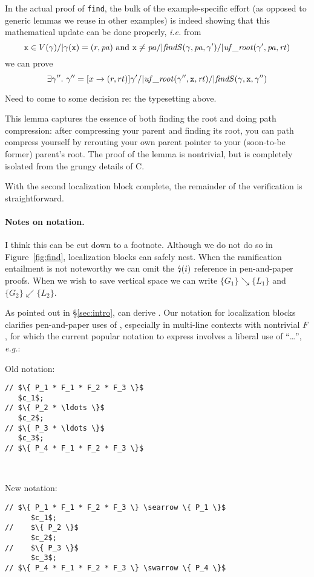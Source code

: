 In the actual proof of \texttt{find}, the bulk of the example-specific effort (as opposed to generic lemmas we reuse in other examples) is indeed showing that this mathematical update can be done properly, \emph{i.e.} from 
\[
\texttt{x} \in V(\gamma) /| \gamma(\texttt{x}) = (r,\mathit{pa}) \text{ and }
\texttt{x} \neq \mathit{pa} /|
\mathit{findS}(\gamma,\mathit{pa},\gamma') /| \mathit{uf\_root}(\gamma',\mathit{pa},\mathit{rt})
\]
we can prove
\[
\exists \gamma''.~ \gamma'' = [x -> (r,rt)]\gamma' /| \mathit{uf\_root}(\gamma'',\texttt{x},\mathit{rt}) /| \mathit{findS}(\gamma,\texttt{x},\gamma'')
\]

{\color{blue} Need to come to some decision re: the typesetting above.}

This lemma captures the essence of both finding the root and doing path compression: after compressing your parent and finding its root, you can path compress yourself by rerouting your own parent pointer to your (soon-to-be former) parent's root.  The proof of the lemma is nontrivial, but is completely isolated from the grungy details of C.

With the second localization block complete, the remainder of the verification is straightforward.

\paragraph{Notes on notation.} 

{\color{magenta} I think this can be cut down to a footnote.} Although we do not do so in Figure~\ref{fig:find}, localization blocks can safely nest.  When the ramification entailment is not noteworthy we can omit the $\mbox{\lightning}(i)$ reference in pen-and-paper proofs.  When we wish to save vertical space we can write $\{ G_1 \} \searrow \{ L_1 \}$ and $\{ G_2 \} \swarrow \{ L_2 \}$.

As pointed out in \S\ref{sec:intro},  can derive .  Our notation for localization blocks clarifies pen-and-paper uses of , especially in multi-line contexts with nontrivial $F$, for which the current popular notation to express  involves a liberal use of ``\ldots'', \emph{e.g.}:

\vspace{5pt}

\begin{minipage}{.19\textwidth}
Old notation:
\begin{lstlisting}
// $\{ P_1 * F_1 * F_2 * F_3 \}$
   $c_1$;
// $\{ P_2 * \ldots \}$
   $c_2$;
// $\{ P_3 * \ldots \}$
   $c_3$;
// $\{ P_4 * F_1 * F_2 * F_3 \}$
\end{lstlisting}
\end{minipage} \vline ~~~
\begin{minipage}{.2\textwidth}
New notation:
\begin{lstlisting}[numbers=none]
// $\{ P_1 * F_1 * F_2 * F_3 \} \searrow \{ P_1 \}$
      $c_1$;
//    $\{ P_2 \}$
      $c_2$;
//    $\{ P_3 \}$
      $c_3$;
// $\{ P_4 * F_1 * F_2 * F_3 \} \swarrow \{ P_4 \}$
\end{lstlisting}
\end{minipage}
\vspace{-0.75ex}

